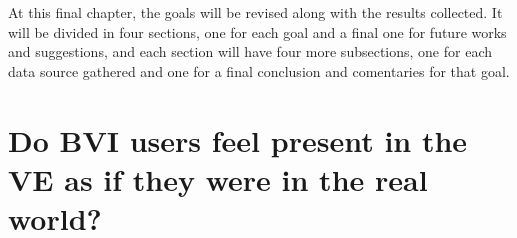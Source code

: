 



At this final chapter, the goals will be revised along with the results collected. It will be divided in four sections, one for each goal and a final one for future works and suggestions, and each section will have four more subsections, one for each data source gathered and one for a final conclusion and comentaries for that goal.



\section{Do BVI users feel present in the VE as if they were in the real world?}

